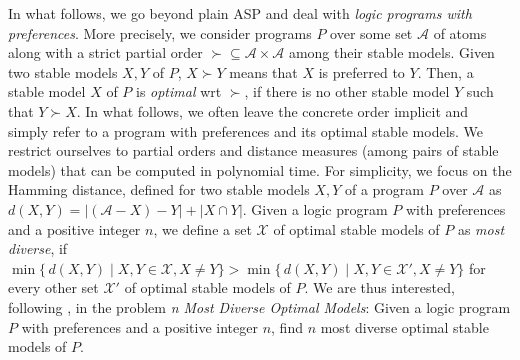 In what follows, we go beyond plain ASP and deal with \emph{logic programs with preferences}.
%
More precisely,
we consider programs $P$ over some set $\mathcal{A}$ of atoms
along with a strict partial order ${\succ}\subseteq{\mathcal{A}\times\mathcal{A}} $ among their stable models. 
Given two stable models $X,Y$ of $P$,
$X\succ Y$ means that $X$ is preferred to $Y$.
%
Then, a stable model $X$ of $P$ is \emph{optimal} wrt $\succ$,
if there is no other stable model $Y$ such that $Y\succ X$.
%
In what follows,
we often leave the concrete order implicit and simply refer to a program with preferences and its optimal stable models.
%
We restrict ourselves to partial orders and distance measures (among pairs of stable models) that can be computed in polynomial time.
%
For simplicity, we focus on the Hamming distance, 
defined for two stable models $X,Y$ of a program $P$ over $\mathcal{A}$ as
\(
d(X,Y)
=
|(\mathcal{A} - X) - Y| + | X \cap Y |
\).
%
Given a logic program $P$ with preferences and a positive integer $n$,
we define %
a set $\mathcal{X}$ of optimal stable models of $P$ as \emph{most diverse},
if
\(
\min \{\, d(X,Y) \mid X, Y \in \mathcal{X},  X \neq Y \} 
> 
\min \{\, d(X,Y) \mid X, Y \in \mathcal{X}', X \neq Y \}
\)
for every other set $\mathcal{X}'$ of optimal stable models of $P$.
%
We are thus interested, following \cite{eiererfi13a}, in the problem \emph{n Most Diverse Optimal Models}:
%
Given a logic program $P$ with preferences and a positive integer $n$, 
find $n$ most diverse optimal stable models of $P$.

